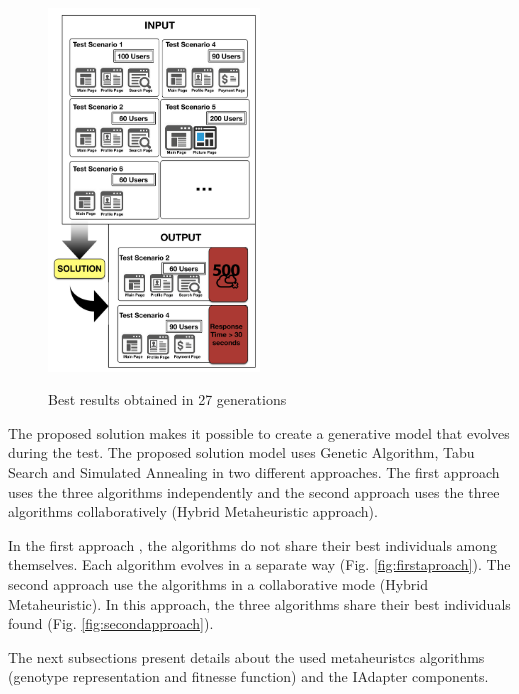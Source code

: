 \begin{figure}[ht]
\centering
\caption{Best results obtained in 27 generations}
\includegraphics[width=0.5\textwidth]{./images/solution.png}
\label{fig:solution}
\end{figure}


The proposed solution makes it possible to create a generative model that evolves during the test. The proposed solution model uses Genetic Algorithm, Tabu Search and Simulated Annealing in two different approaches.  The first approach uses the three algorithms independently and the second approach uses the three algorithms collaboratively (Hybrid Metaheuristic approach).

In the first approach , the algorithms do not share their best individuals among themselves. Each algorithm evolves in a separate way (Fig. \ref{fig:firstaproach}). The second approach use the algorithms in a collaborative mode (Hybrid Metaheuristic). In this approach, the three algorithms share their best individuals found (Fig. \ref{fig:secondapproach}).

The next subsections present details about the used metaheuristcs algorithms (genotype representation and fitnesse function) and the IAdapter components.

